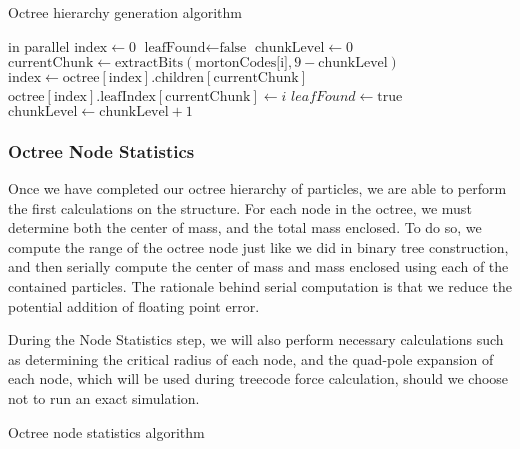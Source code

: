 \documentclass{thesis}
\begin{document}
\begin{algorithm}
    \label{alg:LinkOctree}
    \caption{Octree hierarchy generation algorithm}
    \begin{algorithmic}
         in parallel
            \State $\text{index} \gets 0$
            \State $\text{leafFound} \gets \text{false}$
            \State $\text{chunkLevel} \gets 0$
                \State $\text{currentChunk} \gets \text{extractBits}(\text{mortonCodes[i]}, 9 - \text{chunkLevel})$
                    \State $\text{index} \gets \text{octree}[\text{index}].\text{children}[\text{currentChunk}]$
                \Else
                    \State $\text{octree}[\text{index}].\text{leafIndex}[\text{currentChunk}] \gets i$
                    \State $leafFound \gets \text{true}$
                \EndIf
                \State $\text{chunkLevel} \gets \text{chunkLevel} + 1$
            \EndWhile
        \EndFor
    \end{algorithmic}
\end{algorithm}
\subsubsection{Octree Node Statistics}
Once we have completed our octree hierarchy of particles, we are able to perform the first calculations on the structure. For each node in the octree, we must determine both the center of mass, and the total mass enclosed. To do so, we compute the range of the octree node just like we did in binary tree construction, and then serially compute the center of mass and mass enclosed using each of the contained particles. The rationale behind serial computation is that we reduce the potential addition of floating point error.

During the Node Statistics step, we will also perform necessary calculations such as determining the critical radius of each node, and the quad-pole expansion of each node, which will be used during treecode force calculation, should we choose not to run an exact simulation.

\begin{algorithm}
    \label{alg:OctreeNodeStats}
    \caption{Octree node statistics algorithm}
    \begin{algorithmic}
        \EndFor
    \end{algorithmic}
\end{algorithm}
\end{document}
